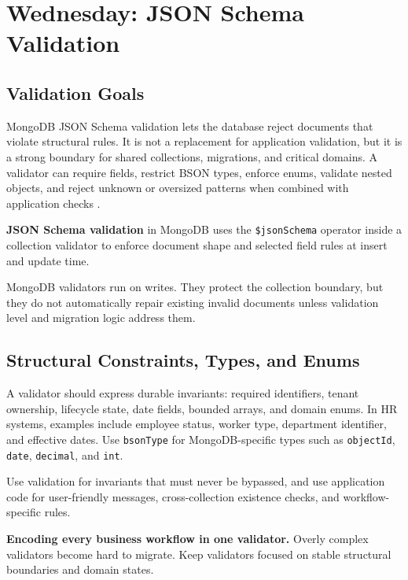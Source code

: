 \section{Wednesday: JSON Schema Validation}
\subsection{Validation Goals}
MongoDB JSON Schema validation lets the database reject documents that violate structural rules. It is not a replacement for application validation, but it is a strong boundary for shared collections, migrations, and critical domains. A validator can require fields, restrict BSON types, enforce enums, validate nested objects, and reject unknown or oversized patterns when combined with application checks \cite{mongodbJsonSchemaDocs}.

\begin{definitionbox}
\textbf{JSON Schema validation} in MongoDB uses the \texttt{\$jsonSchema} operator inside a collection validator to enforce document shape and selected field rules at insert and update time.
\end{definitionbox}

\begin{notebox}
MongoDB validators run on writes. They protect the collection boundary, but they do not automatically repair existing invalid documents unless validation level and migration logic address them.
\end{notebox}

\subsection{Structural Constraints, Types, and Enums}
A validator should express durable invariants: required identifiers, tenant ownership, lifecycle state, date fields, bounded arrays, and domain enums. In HR systems, examples include employee status, worker type, department identifier, and effective dates. Use \texttt{bsonType} for MongoDB-specific types such as \texttt{objectId}, \texttt{date}, \texttt{decimal}, and \texttt{int}.

\begin{tipbox}
Use validation for invariants that must never be bypassed, and use application code for user-friendly messages, cross-collection existence checks, and workflow-specific rules.
\end{tipbox}

\begin{pitfall}
\textbf{Encoding every business workflow in one validator.} Overly complex validators become hard to migrate. Keep validators focused on stable structural boundaries and domain states.
\end{pitfall}

